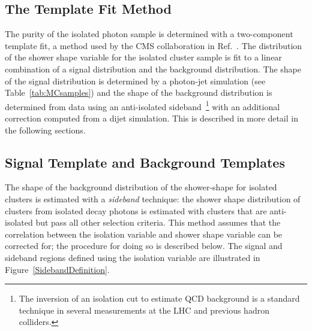 \subsection{The Template Fit Method}
The purity of the isolated photon sample is determined with a two-component template fit, a method used by the CMS collaboration in Ref.~\cite{Sirunyan:2017qhf}. The distribution of the shower shape variable for the isolated cluster sample is fit to a linear combination of a signal distribution and the background distribution. The shape of the signal distribution is determined by a photon-jet simulation (see Table~\ref{tab:MCsamples}) and the shape of the background distribution is determined from data using an anti-isolated sideband~\footnote{The inversion of an isolation cut to estimate QCD background is a standard technique in several measurements at the LHC and previous hadron colliders.} with an additional correction computed from a dijet simulation. This is described in more detail in the following sections.  

\subsection{Signal Template and Background Templates }
The shape of the background distribution of the shower-shape for isolated clusters is estimated with a \textit{sideband} technique: the shower shape distribution of clusters from isolated decay photons is estimated with clusters that are anti-isolated but pass all other selection criteria. This method assumes that the correlation between the isolation variable and shower shape variable can be corrected for; the procedure for doing so is described below. The signal and sideband regions defined using the isolation variable are illustrated in Figure~\ref{SidebandDefinition}. 

